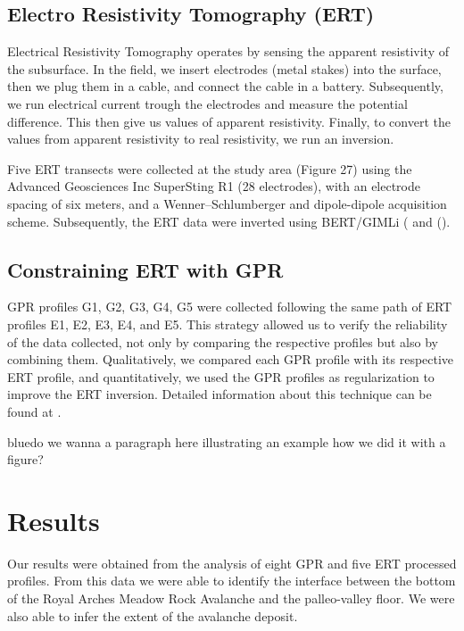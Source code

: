 \documentclass[5p]{elsarticle}
\newcommand{\COMON}{\begin{color}{blue}}
\newcommand{\COMOFF}{\end{color}}
\begin{document}
												
												
		\subsection{Electro Resistivity Tomography (ERT)}

Electrical Resistivity Tomography operates by sensing the apparent resistivity of the subsurface. In the field, we insert electrodes (metal stakes) into the surface, then we plug them in a cable, and connect the cable in a battery. Subsequently, we run electrical current trough the electrodes and measure the potential difference. This then give us values of apparent resistivity. Finally, to convert the values from apparent resistivity to real resistivity, we run an inversion.

Five ERT transects were collected at the study area (Figure 27) using the Advanced Geosciences Inc SuperSting R1 (28 electrodes), with an electrode spacing of six meters, and a Wenner–Schlumberger and dipole-dipole acquisition scheme. Subsequently, the ERT data were inverted using BERT/GIMLi (\cite{gunther2006three} and (\cite{Ruecker2017}).

	
	\subsection{Constraining ERT with GPR}
										
GPR profiles G1, G2, G3, G4, G5 were collected following the same path of ERT profiles E1, E2, E3, E4, and E5. This strategy allowed us to verify the reliability of the data collected, not only by comparing the respective profiles but also by combining them. Qualitatively, we compared each GPR profile with its respective ERT profile, and quantitatively, we used the GPR profiles as regularization to improve the ERT inversion. Detailed information about this technique can be found at \cite{doetsch2012constraining}.

\COMON do we wanna a paragraph here illustrating an example how we did it with a figure?\COMOFF
									
									
									
									
									
\section{Results}
										
Our results were obtained from the analysis of eight GPR and five ERT processed profiles. From this data we were able to identify the interface between the bottom of the Royal Arches Meadow Rock Avalanche and the palleo-valley floor. We were also able to infer the extent of the avalanche deposit.  
\end{document}
